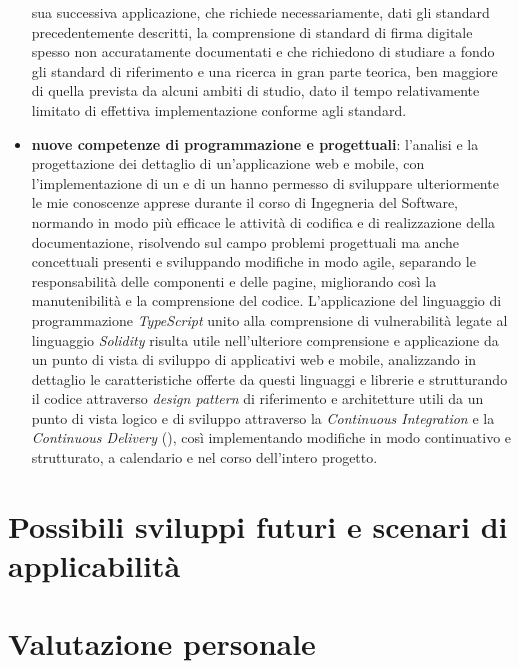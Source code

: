 \begin{itemize}
    sua successiva applicazione, che richiede necessariamente, dati gli standard precedentemente descritti, la comprensione di standard di firma digitale spesso non accuratamente documentati e che richiedono di studiare a fondo gli standard di riferimento e una ricerca
    in gran parte teorica, ben maggiore di quella prevista da alcuni ambiti di studio, dato il tempo relativamente limitato di effettiva implementazione conforme agli standard.
    \item \textbf{nuove competenze di programmazione e progettuali}: l'analisi e la progettazione dei dettaglio di un'applicazione web e mobile, con l'implementazione di un {\textbf{}} e di un {\textbf{}} hanno permesso di sviluppare ulteriormente le mie conoscenze apprese durante il corso di Ingegneria
    del Software, normando in modo più efficace le attività di codifica e di realizzazione della documentazione, risolvendo sul campo problemi progettuali ma anche concettuali presenti e sviluppando modifiche in modo agile, separando le responsabilità delle componenti e delle pagine, 
    migliorando così la manutenibilità e la comprensione del codice. 
    L'applicazione del linguaggio di programmazione \textit{TypeScript} unito alla comprensione di vulnerabilità legate al linguaggio \textit{Solidity} risulta utile nell'ulteriore comprensione e applicazione da un punto di vista di sviluppo di applicativi web e mobile, 
    analizzando in dettaglio le caratteristiche offerte da questi linguaggi e librerie e strutturando il codice attraverso \textit{design pattern} di riferimento e architetture utili da un punto di vista logico e di sviluppo attraverso la \textit{Continuous Integration} e la \textit{Continuous Delivery} (\cite{site:cicd}), così implementando modifiche in modo continuativo 
    e strutturato, a calendario e nel corso dell'intero progetto. 
\end{itemize}

\section{Possibili sviluppi futuri e scenari di applicabilità}\label{sec:conclusioni-conoscenze-sviluppi}



\section{Valutazione personale}\label{sec:conclusioni-valutazione}

